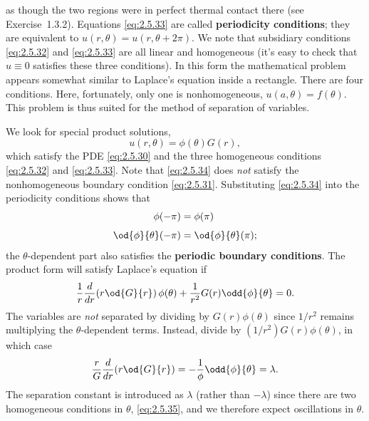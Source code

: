as though the two regions were in perfect thermal contact there (see Exercise~1.3.2). Equations \eqref{eq:2.5.33} are called \textbf{periodicity conditions}; they are equivalent to $u(r,\theta) = u(r,\theta + 2\pi)$. We note that subsidiary conditions \eqref{eq:2.5.32} and \eqref{eq:2.5.33} are all linear and homogeneous (it's easy to check that $u \equiv 0$ satisfies these three conditions). In this form the mathematical problem appears somewhat similar to Laplace's equation inside a rectangle. There are four conditions. Here, fortunately, only one is nonhomogeneous, $u(a,\theta) = f(\theta)$. This problem is thus suited for the method of separation of variables.

We look for special product solutions,
\begin{equation}
\label{eq:2.5.34}
u(r,\theta) = \phi(\theta)G(r),
\end{equation}
which satisfy the PDE \eqref{eq:2.5.30} and the three homogeneous conditions \eqref{eq:2.5.32} and \eqref{eq:2.5.33}. Note that \eqref{eq:2.5.34} does \emph{not} satisfy the nonhomogeneous boundary condition \eqref{eq:2.5.31}. Substituting \eqref{eq:2.5.34} into the periodicity conditions shows that
\begin{equation}
\label{eq:2.5.35}
\begin{aligned}
\phi(-\pi) &= \phi(\pi) \\[4pt]
\od{\phi}{\theta}(-\pi) &= \od{\phi}{\theta}(\pi);
\end{aligned}
\end{equation}
the $\theta$-dependent part also satisfies the \textbf{periodic boundary conditions}. The product form will satisfy Laplace's equation if
\[
\frac{1}{r}\frac{d}{d r}\!\left(r\od{G}{r}\right)\phi(\theta) + \frac{1}{r^2}G(r)\odd{\phi}{\theta} = 0.
\]
The variables are \emph{not} separated by dividing by $G(r)\phi(\theta)$ since $1/r^2$ remains multiplying the $\theta$-dependent terms. Instead, divide by $(1/r^2)G(r)\phi(\theta)$, in which case
\begin{equation}
\label{eq:2.5.36}
\frac{r}{G}\frac{d}{d r}\!\left(r\od{G}{r}\right) = -\frac{1}{\phi}\odd{\phi}{\theta} = \lambda.
\end{equation}
The separation constant is introduced as $\lambda$ (rather than $-\lambda$) since there are two homogeneous conditions in $\theta$, \eqref{eq:2.5.35}, and we therefore expect oscillations in $\theta$.

